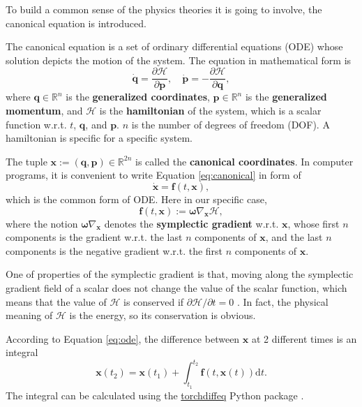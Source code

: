 \documentclass{article}
\begin{document}
To build a common sense of the physics theories it is going to involve,
the canonical equation is introduced.

The canonical equation is a set of ordinary differential equations (ODE)
whose solution depicts the motion of the system.
The equation in mathematical form is \cite{hand2008mechanics}\cite[p. 65]{arnold1989mathmech}\cite[p. 132]{landau1976mechanics}
\begin{equation}
	\dot{\mathbf q}=\frac{\partial\mathcal H}{\partial\mathbf p},
	\quad
	\dot{\mathbf p}=-\frac{\partial\mathcal H}{\partial\mathbf q},
	\label{eq:canonical}
\end{equation}
where $\mathbf q\in\mathbb R^n$ is the \textbf{generalized coordinates},
$\mathbf p\in\mathbb R^n$ is the \textbf{generalized momentum},
and $\mathcal H$ is the \textbf{hamiltonian} of the system,
which is a scalar function w.r.t. $t$, $\mathbf q$, and $\mathbf p$.
$n$ is the number of degrees of freedom (DOF).
A hamiltonian is specific for a specific system.

The tuple $\mathbf x:=\left(\mathbf q,\mathbf p\right)\in\mathbb R^{2n}$
is called the \textbf{canonical coordinates}.
In computer programs, it is convenient to write Equation \ref{eq:canonical}
in form of
\begin{equation}
	\dot{\mathbf x}=\mathbf f\left(t,\mathbf x\right),
\end{equation}
which is the common form of ODE.
Here in our specific case,
\begin{equation}
	\mathbf f\left(t,\mathbf x\right):=\boldsymbol\omega\nabla_{\mathbf x}\mathcal H,
	\label{eq:ode}
\end{equation}
where the notion $\boldsymbol\omega\nabla_{\mathbf x}$ denotes the \textbf{symplectic gradient} w.r.t. $\mathbf x$,
whose first $n$ components is the gradient w.r.t. the last $n$ components of $\mathbf x$,
and the last $n$ components is the negative gradient w.r.t. the first $n$ components of $\mathbf x$.

One of properties of the symplectic gradient is that,
moving along the symplectic gradient field of a scalar does not change the value of the scalar function,
which means that the value of $\mathcal H$ is conserved if $\partial\mathcal H/\partial t=0$ \cite[p. 67]{arnold1989mathmech}\cite[p. 132]{landau1976mechanics}.
In fact, the physical meaning of $\mathcal H$ is the energy,
so its conservation is obvious.

According to Equation \ref{eq:ode}, the difference between $\mathbf x$ at 2 different times is an integral
\begin{equation}
	\mathbf x\left(t_2\right)=\mathbf x\left(t_1\right)+\int_{t_1}^{t_2}\mathbf f\left(t,\mathbf x\left(t\right)\right)\mathrm dt.
	\label{eq:int}
\end{equation}
The integral can be calculated using the \href{https://github.com/rtqichen/torchdiffeq}{torchdiffeq} Python package \cite{chen2018ode}.
\end{document}
